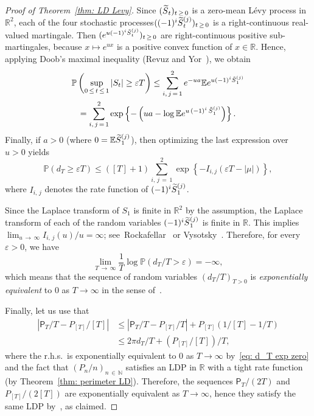 \documentclass[AHL,Unicode,published]{cedram}
\newcommand{\Rbb}{\mathbb{R}}
\newcommand{\N}{\mathbb{N}}
\newcommand{\E}{\mathbb{E}}
\newcommand{\Pbb}{\mathbb{P}}
\newcommand{\sfP}{\mathsf{P}}
\let\oldtilde\tilde
\renewcommand*{\tilde}[1]{\mathchoice{\widetilde{#1}}{\widetilde{#1}}{\oldtilde{#1}}{\oldtilde{#1}}}
\begin{document}
\begin{proof}[Proof of Theorem~\ref{thm: LD Levy}]
Since $(\tilde S_t)_{t\,\ge\,0}$ is a zero-mean L\'evy process in $\Rbb^2$, each of the four stochastic proce\-sses$((-1)^i \tilde S_t^{(j)})_{t\,\ge\,0}$ is a right-continuous real-valued martingale. Then $ (e^{u (-1)^i \tilde S_t^{(j)}})_{t \,\ge\,0}$ are right-continuous positive sub-martingales, because $x \mapsto e^{u x}$ is a positive convex function of $ x \in \Rbb$. Hence, applying Doob's maximal inequality (Revuz and Yor~\cite[Theorem~1.7, Chapter~II]{RevuzYor}), we obtain
\begin{multline*}
\Pbb \left(\sup_{0\,\le\,t\,\le\,1} |S_t | \ge \varepsilon T \right) \le \sum_{i,\,j\,=\,1}^2 e^{-ua } \E e^{u (-1)^i \tilde S_1^{(j)}}\\
= \sum_{i,\,j\,=\,1}^2 \exp \left\{- \left(ua - \log \E e^{u\,(-1)^i\,\tilde S_1^{(j)}} \right) \right\}.
\end{multline*}
Finally, if $a>0$ (where $0=\E \tilde S_1^{(j)} $), then optimizing the last expression over $u >0$ yields
\[
\Pbb \left(d_T \ge \varepsilon T \right) \le ([T] +1) \sum_{i,\, j\,=\,1}^2 \exp \left\{- I_{i, j} \left(\varepsilon T - |\mu| \right) \right\},
\]
where $I_{i,\,j}$ denotes the rate function of $(-1)^i \tilde S_1^{(j)}$.

Since the Laplace transform of $S_1$ is finite in $\Rbb^2$ by the assumption, the Laplace transform of each of the random variables $(-1)^i \tilde S_1^{(j)}$ is finite in $\Rbb$. This implies $\lim_{u\,\to\,\infty} I_{i,\,j}(u)/u = \infty$; see~Rockafellar~\cite[Theorems~8.5 and 13.3]{Rockafellar} or Vysotsky~\cite[Eqs.~(5.4) and~(5.5)]{VysotskyNote}. Therefore, for every $\varepsilon >0$, we have
\begin{equation}\label{eq: d_T exp zero}
\lim_{T\,\to\,\infty} \frac{1}{T} \log \Pbb \left(d_T/T> \varepsilon \right) = -\infty,
\end{equation}
which means that the sequence of random variables $(d_T/T)_{T >0} $ is \emph{exponentially equivalent} to $0$ as $T \to \infty$ in the sense of~\cite[Definition~4.2.10]{DemboZeitouni}.

Finally, let us use that
\begin{align*}
\left|\sfP_T/T - P_{[T]}/[T] \right| &\le \left|\sfP_T/T - P_{[T]}/T \right| + P_{[T]}\left(1/[T]-1/T\right)\\
&\le 2 \pi d_T/T + \left(P_{[T]}/[T]\right)/T,
\end{align*}
where the r.h.s.\ is exponentially equivalent to $0$ as $T \to \infty$ by~\eqref{eq: d_T exp zero} and the fact that $ (P_n/n)_{n\,\in\,\N} $ satisfies an LDP in $\Rbb$ with a tight rate function (by Theorem~\ref{thm: perimeter LD}). Therefore, the sequences $\sfP_T/(2T) $ and $ P_{[T]}/(2[T]) $ are exponentially equivalent as $T \to \infty$, hence they satisfy the same LDP by~\cite[Theorem~4.2.13]{DemboZeitouni}, as claimed.


\end{proof}
\end{document}
